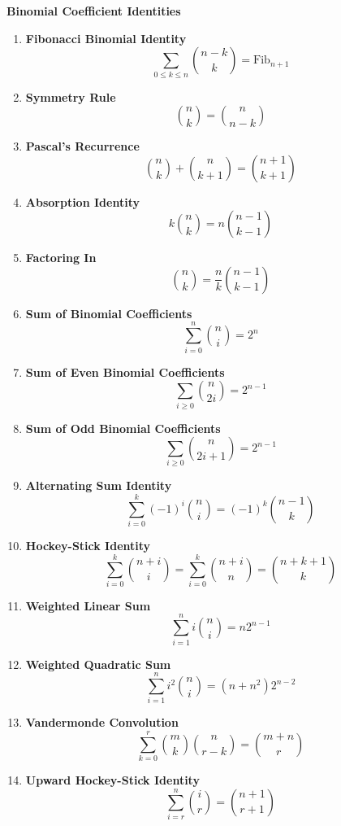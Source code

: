 \textbf{Binomial Coefficient Identities}
\begin{enumerate}[leftmargin=*]
    \item \textbf{Fibonacci Binomial Identity}
        \[\sum_{0\leq k \leq n} \binom{n-k}{k} = \text{Fib}_{n+1}\]
    
    \item \textbf{Symmetry Rule}
        \[\binom{n}{k} = \binom{n}{n-k}\]
    
    \item \textbf{Pascal's Recurrence}
        \[\binom{n}{k} + \binom{n}{k+1} = \binom{n+1}{k+1}\]
    
    \item \textbf{Absorption Identity}
        \[k\binom{n}{k} = n\binom{n-1}{k-1}\]
    
    \item \textbf{Factoring In}
        \[\binom{n}{k} = \frac{n}{k}\binom{n-1}{k-1}\]
    
    \item \textbf{Sum of Binomial Coefficients}
        \[\sum_{i=0}^n \binom{n}{i} = 2^n\]
    
    \item \textbf{Sum of Even Binomial Coefficients}
        \[\sum_{i\geq 0} \binom{n}{2i} = 2^{n-1}\]
    
    \item \textbf{Sum of Odd Binomial Coefficients}
        \[\sum_{i\geq 0} \binom{n}{2i+1} = 2^{n-1}\]
    
    \item \textbf{Alternating Sum Identity}
        \[\sum_{i=0}^k (-1)^i \binom{n}{i} = (-1)^k \binom{n-1}{k}\]
    
    \item \textbf{Hockey-Stick Identity}
        \[\sum_{i=0}^k \binom{n+i}{i} = \sum_{i=0}^k \binom{n+i}{n} = \binom{n+k+1}{k}\]
    
    \item \textbf{Weighted Linear Sum}
        \[\sum_{i=1}^n i\binom{n}{i} = n2^{n-1}\]
    
    \item \textbf{Weighted Quadratic Sum}
        \[\sum_{i=1}^n i^2\binom{n}{i} = (n+n^2)2^{n-2}\]
    
    \item \textbf{Vandermonde Convolution}
        \[\sum_{k=0}^r \binom{m}{k}\binom{n}{r-k} = \binom{m+n}{r}\]
    
    \item \textbf{Upward Hockey-Stick Identity}
        \[\sum_{i=r}^n \binom{i}{r} = \binom{n+1}{r+1}\]
    

\end{enumerate}

